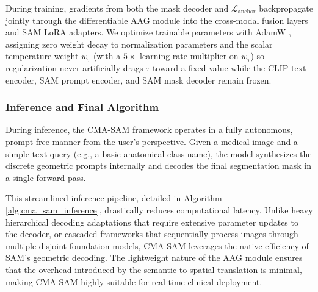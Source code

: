 \documentclass[onecolumn]{IEEEtran}
\numberwithin{equation}{section}
\theoremstyle{definition}
\theoremstyle{remark}
\begin{document}
During training, gradients from both the mask decoder and $\mathcal{L}_{\text{anchor}}$ backpropagate jointly through the differentiable AAG module into the cross-modal fusion layers and SAM LoRA adapters. We optimize trainable parameters with AdamW \cite{loshchilov2017decoupled}, assigning zero weight decay to normalization parameters and the scalar temperature weight $w_\tau$ (with a $5\times$ learning-rate multiplier on $w_\tau$) so regularization never artificially drags $\tau$ toward a fixed value while the CLIP text encoder, SAM prompt encoder, and SAM mask decoder remain frozen.

\subsubsection{Inference and Final Algorithm}
During inference, the CMA-SAM framework operates in a fully autonomous, prompt-free manner from the user's perspective. Given a medical image and a simple text query (e.g., a basic anatomical class name), the model synthesizes the discrete geometric prompts internally and decodes the final segmentation mask in a single forward pass. 

This streamlined inference pipeline, detailed in Algorithm \ref{alg:cma_sam_inference}, drastically reduces computational latency. Unlike heavy hierarchical decoding adaptations \cite{cheng2024unleashing} that require extensive parameter updates to the decoder, or cascaded frameworks \cite{li2024clipsam} that sequentially process images through multiple disjoint foundation models, CMA-SAM leverages the native efficiency of SAM's geometric decoding. The lightweight nature of the AAG module ensures that the overhead introduced by the semantic-to-spatial translation is minimal, making CMA-SAM highly suitable for real-time clinical deployment.
\end{document}

